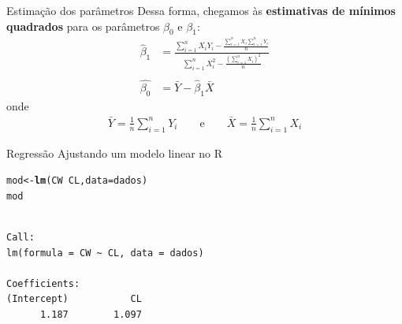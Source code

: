 \documentclass[10pt]{beamer}\usepackage[]{graphicx}\usepackage[]{color}
\makeatletter
\newcommand{\hlopt}[1]{\textcolor[rgb]{0,0,0}{#1}}%
\newcommand{\hlstd}[1]{\textcolor[rgb]{0.345,0.345,0.345}{#1}}%
\newcommand{\hlkwb}[1]{\textcolor[rgb]{0.69,0.353,0.396}{#1}}%
\newcommand{\hlkwc}[1]{\textcolor[rgb]{0.333,0.667,0.333}{#1}}%
\newcommand{\hlkwd}[1]{\textcolor[rgb]{0.737,0.353,0.396}{\textbf{#1}}}%
\newenvironment{kframe}{%
 \def\at@end@of@kframe{}%
 \ifinner\ifhmode%
  \def\at@end@of@kframe{\end{minipage}}%
  \begin{minipage}{\columnwidth}%
 \fi\fi%
 \def\FrameCommand##1{\hskip\@totalleftmargin \hskip-\fboxsep
 \colorbox{shadecolor}{##1}\hskip-\fboxsep
     \hskip-\linewidth \hskip-\@totalleftmargin \hskip\columnwidth}%
 \MakeFramed {\advance\hsize-\width
   \@totalleftmargin\z@ \linewidth\hsize
   \@setminipage}}%
 {\par\unskip\endMakeFramed%
 \at@end@of@kframe}
\newenvironment{knitrout}{}{} %
\providecommand{\R}{\textsf{R}\xspace}
\theoremstyle{definition}
\makeatother
\begin{document}
\begin{frame}[fragile]{Estimação dos parâmetros}
  Dessa forma, chegamos às \textbf{estimativas de mínimos quadrados}
  para os parâmetros $\beta_0$ e $\beta_1$:
  \begin{align*}
    \hat{\beta}_1 &= \frac{\sum_{i=1}^{n} X_iY_i - \frac{\sum_{i=1}^{n}
        X_i \sum_{i=1}^{n} Y_i}{n}}{\sum_{i=1}^{n}X_i^2 -
      \frac{(\sum_{i=1}^{n} X_i)^2}{n}} \\
    & \\
    \hat{\beta_0} &= \bar{Y} - \hat{\beta}_1 \bar{X}
  \end{align*}
  onde
  \begin{align*}
    \bar{Y} = \frac{1}{n} \sum_{i=1}^{n} Y_i \qquad \text{e} \qquad
    \bar{X} = \frac{1}{n} \sum_{i=1}^{n} X_i
  \end{align*}
\end{frame}

\begin{frame}[fragile=singleslide]{Regressão}
Ajustando um modelo linear no \R
\begin{knitrout}\small
{}\color{fgcolor}\begin{kframe}
\begin{alltt}
\hlstd{mod} \hlkwb{<-} \hlkwd{lm}\hlstd{(CW} \hlopt{~} \hlstd{CL,} \hlkwc{data} \hlstd{= dados)}
\hlstd{mod}
\end{alltt}
\begin{verbatim}

Call:
lm(formula = CW ~ CL, data = dados)

Coefficients:
(Intercept)           CL  
      1.187        1.097  
\end{verbatim}
\end{kframe}
\end{knitrout}
\end{frame}
\end{document}
